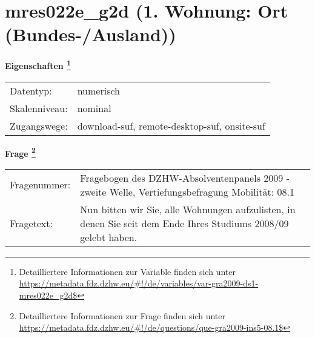 
    \setcounter{footnote}{0}

    \vspace*{-1.8cm}
	\section{mres022e\_g2d (1. Wohnung: Ort (Bundes-/Ausland))}
	\label{section:mres022e_g2d}



    \vspace*{0.5cm}
    \noindent\textbf{Eigenschaften
	\footnote{Detailliertere Informationen zur Variable finden sich unter
		\url{https://metadata.fdz.dzhw.eu/\#!/de/variables/var-gra2009-ds1-mres022e_g2d$}}}\\
	\begin{tabularx}{\hsize}{@{}lX}
	Datentyp: & numerisch \\
	Skalenniveau: & nominal \\
	Zugangswege: &
	  download-suf, 
	  remote-desktop-suf, 
	  onsite-suf
 \\
    \end{tabularx}



				\vspace*{0.5cm}
                \noindent\textbf{Frage
	                \footnote{Detailliertere Informationen zur Frage finden sich unter
		              \url{https://metadata.fdz.dzhw.eu/\#!/de/questions/que-gra2009-ins5-08.1$}}}\\
				\begin{tabularx}{\hsize}{@{}lX}
					Fragenummer: &
					  Fragebogen des DZHW-Absolventenpanels 2009 - zweite Welle, Vertiefungsbefragung Mobilität:
					  08.1
 \\
					Fragetext: & Nun bitten wir Sie, alle Wohnungen aufzulisten, in denen Sie seit dem Ende Ihres Studiums 2008/09 gelebt haben. \\
				\end{tabularx}





